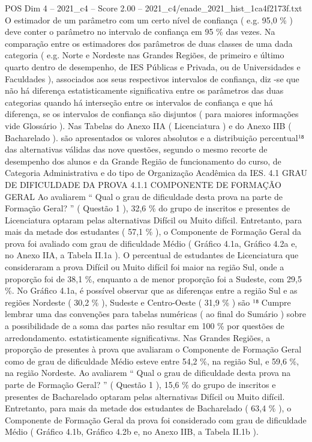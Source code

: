 \begin{textsample}{POS Dim 4 – 2021\_c4 – Score 2.00 – 2021\_c4/enade\_2021\_hist\_1ca4f2173f.txt}
O estimador de um parâmetro com um certo nível de confiança ( e.g. 95,0 \% ) deve conter o parâmetro no intervalo de confiança em 95 \% das vezes.
Na comparação entre os estimadores dos parâmetros de duas classes de uma dada categoria ( e.g.
Norte e Nordeste nas Grandes Regiões, de primeiro e último quarto dentro de desempenho, de IES Públicas e Privada, ou de Universidades e Faculdades ), associados aos seus respectivos intervalos de confiança, diz -se que não há diferença estatisticamente significativa entre os parâmetros das duas categorias quando há interseção entre os intervalos de confiança e que há diferença, se os intervalos de confiança são disjuntos ( para maiores informações vide Glossário ).
Nas Tabelas do Anexo IIA ( Licenciatura ) e do Anexo IIB ( Bacharelado ). são apresentados os valores absolutos e a distribuição percentual¹⁸ das alternativas válidas das nove questões, segundo o mesmo recorte de desempenho dos alunos e da Grande Região de funcionamento do curso, de Categoria Administrativa e do tipo de Organização Acadêmica da IES. 4.1 GRAU DE DIFICULDADE DA PROVA 4.1.1 COMPONENTE DE FORMAÇÃO GERAL Ao avaliarem “ Qual o grau de dificuldade desta prova na parte de Formação Geral? ” ( Questão 1 ), 32,6 \% do grupo de inscritos e presentes de Licenciatura optaram pelas alternativas Difícil ou Muito difícil.
Entretanto, para mais da metade dos estudantes ( 57,1 \% ), o Componente de Formação Geral da prova foi avaliado com grau de dificuldade Médio ( Gráfico 4.1a, Gráfico 4.2a e, no Anexo IIA, a Tabela II.1a ).
O percentual de estudantes de Licenciatura que consideraram a prova Difícil ou Muito difícil foi maior na região Sul, onde a proporção foi de 38,1 \%, enquanto a de menor proporção foi a Sudeste, com 29,5 \%.
No Gráfico 4.1a, é possível observar que as diferenças entre a região Sul e as regiões Nordeste ( 30,2 \% ), Sudeste e Centro-Oeste ( 31,9 \% ) são ¹⁸ Cumpre lembrar uma das convenções para tabelas numéricas ( ao final do Sumário ) sobre a possibilidade de a soma das partes não resultar em 100 \% por questões de arredondamento. estatisticamente significativas.
Nas Grandes Regiões, a proporção de presentes à prova que avaliaram o Componente de Formação Geral como de grau de dificuldade Médio esteve entre 54,2 \%, na região Sul, e 59,6 \%, na região Nordeste.
Ao avaliarem “ Qual o grau de dificuldade desta prova na parte de Formação Geral? ” ( Questão 1 ), 15,6 \% do grupo de inscritos e presentes de Bacharelado optaram pelas alternativas Difícil ou Muito difícil.
Entretanto, para mais da metade dos estudantes de Bacharelado ( 63,4 \% ), o Componente de Formação Geral da prova foi considerado com grau de dificuldade Médio ( Gráfico 4.1b, Gráfico 4.2b e, no Anexo IIB, a Tabela II.1b ).

\end{textsample}
